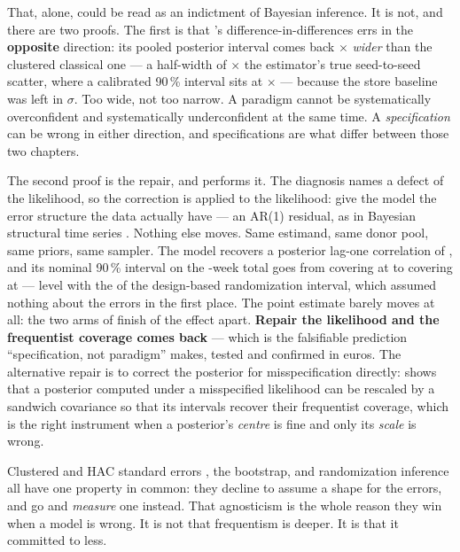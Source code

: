 That, alone, could be read as an indictment of Bayesian inference. It is not, and there are two
proofs. The first is that 's difference-in-differences errs in the \textbf{opposite}
direction: its pooled posterior interval comes back \nbEightBayesOverCluster$\times$ \emph{wider}
than the clustered classical one --- a half-width of \nbEightPooledOverScatter$\times$ the
estimator's true seed-to-seed scatter, where a calibrated 90\,\% interval sits at
\nbEightCalibratedRatio$\times$ --- because the store baseline was left in $\sigma$. Too wide, not
too narrow. A paradigm cannot be systematically overconfident and systematically underconfident at
the same time. A \emph{specification} can be wrong in either direction, and specifications are what
differ between those two chapters.

The second proof is the repair, and  performs it. The diagnosis names a defect of the
likelihood, so the correction is applied to the likelihood: give the model the error structure the
data actually have --- an AR(1) residual, as in Bayesian structural time series
\citep{brodersen2015}. Nothing else moves. Same estimand, same donor pool, same priors, same
sampler. The model recovers a posterior lag-one correlation of \nbSevenRhoPost{}, and its nominal
90\,\% interval on the \nbSevenNPost-week total goes from covering at \pc{\nbSevenTotalCov} to
covering at \pc{\nbSevenTotalCovArone} --- level with the \pc{\nbSevenRiCov} of the design-based
randomization interval, which assumed nothing about the errors in the first place. The point
estimate barely moves at all: the two arms of  finish \pc{\nbSevenEstDiffPct} of the effect
apart. \textbf{Repair the likelihood and the frequentist coverage comes back} --- which is the
falsifiable prediction ``specification, not paradigm'' makes, tested and confirmed in euros. The
alternative repair is to correct the posterior for misspecification directly: \citet{mueller2013}
shows that a posterior computed under a misspecified likelihood can be rescaled by a sandwich
covariance so that its intervals recover their frequentist coverage, which is the right instrument
when a posterior's \emph{centre} is fine and only its \emph{scale} is wrong.

\begin{remark}
Clustered and HAC standard errors \citep{newey1987, bertrand2004}, the bootstrap, and randomization
inference all have one property in common: they decline to assume a shape for the errors, and go and
\emph{measure} one instead. That agnosticism is the whole reason they win when a model is wrong. It
is not that frequentism is deeper. It is that it committed to less.
\end{remark}

